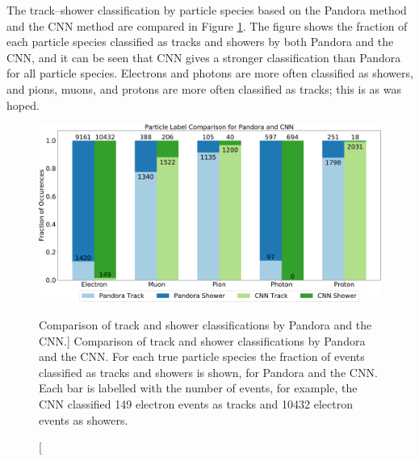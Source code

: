 The track--shower classification by particle species based on the Pandora 
method and the CNN method are compared in Figure \ref{fig:track_show_pan_cnn}. 
The figure shows the fraction of each particle species classified as tracks and
showers by both Pandora and the CNN, and it can be seen that CNN gives a 
stronger classification than Pandora for all particle species. Electrons and 
photons are more often classified as showers, and pions, muons, and protons 
are more often classified as tracks; this is as was hoped. 
\begin{figure}
	\centering
	\includegraphics[width=\textwidth]{figures/track_shower_labels.pdf}
	\caption
	[Comparison of track and shower classifications by Pandora and the CNN.]
	{Comparison of track and shower classifications by Pandora and the CNN. For
	each true particle species the fraction of events classified as tracks and
	showers is shown, for Pandora and the CNN. Each bar is labelled with the 
	number of events, for example, the CNN classified 149 electron events as 
	tracks and 10432 electron events as showers.}
	\label{fig:track_show_pan_cnn}
\end{figure}

